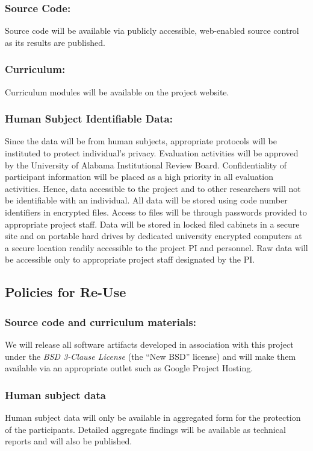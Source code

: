 \subsubsection*{Source Code:} Source code will be available via publicly accessible, web-enabled source control as its results are published.  

\subsubsection*{Curriculum:} Curriculum modules will be available on the project website.

\subsubsection*{Human Subject Identifiable Data:} Since the data will be from human subjects, appropriate protocols will be instituted to protect individual's privacy. Evaluation activities will be approved by the University of Alabama Institutional Review Board. Confidentiality of participant information will be placed as a high priority in all evaluation activities. Hence, data accessible to the project and to other researchers will not be identifiable with an individual. All data will be stored using code number identifiers in encrypted files. Access to files will be through passwords provided to appropriate project staff. Data will be stored in locked filed cabinets in a secure site and on portable hard drives by dedicated university encrypted computers at a secure location readily accessible to the project PI and personnel. Raw data will be accessible only to appropriate project staff designated by the PI.

\subsection*{Policies for Re-Use}

\subsubsection*{Source code and curriculum materials:} We will release all software artifacts developed in association with this project under the \textit{BSD 3-Clause License} (the ``New BSD'' license) and will make them available via an appropriate outlet such as Google Project Hosting.


\subsubsection*{Human subject data} Human subject data will only be available in aggregated form for the protection of the participants.  Detailed aggregate findings will be available as technical reports and will also be published.


